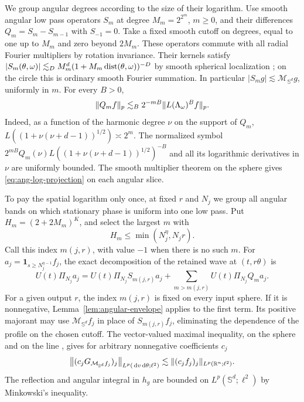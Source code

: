 We group angular degrees according to the size of their logarithm.
Use smooth angular low pass operators $S_m$ at degree $M_m=2^{2^m}$,
$m\ge0$, and their differences $Q_m=S_m-S_{m-1}$ with $S_{-1}=0$.
Take a fixed smooth cutoff on degrees, equal to one up to $M_m$ and
zero beyond $2M_m$. These operators commute with all radial Fourier
multipliers by rotation invariance. Their kernels satisfy
$|S_m(\theta,\omega)|\lesssim_D M_m^d
(1+M_m\operatorname{dist}(\theta,\omega))^{-D}$ by smooth spherical localization
\cite[Theorem~3.5 and Corollaries~3.6, 5.3]{NPW2006}; on the circle this is
ordinary smooth Fourier summation. In particular
$|S_m g|\lesssim\mathcal M_{\mathbb S^d}g$, uniformly in $m$.
For every $B>0$,
\begin{equation}\label{eq:ang-log-projection}
 \|Q_m f\|_p\lesssim_B 2^{-mB}\|L(\Lambda_\omega)^B f\|_p .
\end{equation}
Indeed, as a function of the harmonic degree $\nu$ on the support of
$Q_m$, $L((1+\nu(\nu+d-1))^{1/2})\asymp2^m$. The normalized symbol
$2^{mB}Q_m(\nu)L((1+\nu(\nu+d-1))^{1/2})^{-B}$ and all its logarithmic
derivatives in $\nu$ are uniformly bounded. The smooth multiplier theorem
on the sphere \cite[Theorem~4.9(1)]{BonamiClerc1973} gives \eqref{eq:ang-log-projection}
on each angular slice.

To pay the spatial logarithm only once, at fixed $r$ and $N_j$ we group
all angular bands on which stationary phase is uniform into one low pass.
Put
$H_m=(2+2M_m)^K$, and select the largest $m$ with
\begin{equation}\label{eq:ang-eligibility}
 H_m\le \min(N_j^\eta,N_jr).
\end{equation}
Call this index $m(j,r)$, with value $-1$ when there is no such $m$.
For $a_j=\mathbf1_{s\ge N_j^{\eta-1}}f_j$, the exact decomposition of
the retained wave at $(t,r\theta)$ is
\[
 U(t)\Pi_{N_j}a_j=U(t)\Pi_{N_j}S_{m(j,r)}a_j+
            \sum_{m>m(j,r)}U(t)\Pi_{N_j}Q_ma_j.
\]
For a given output $r$, the index $m(j,r)$ is fixed on every input
sphere. If it is nonnegative, Lemma~\ref{lem:angular-envelope} applies
to the first term. Its positive majorant may use
$\mathcal M_{\mathbb S^d}f_j$ in place of $S_{m(j,r)}f_j$, eliminating
the dependence of the profile on the chosen cutoff. The vector-valued
maximal inequality, on the sphere and on the line \cite[Theorem~1.2]{GLY2009}, gives for arbitrary
nonnegative coefficients $c_j$
\[
 \big\|(c_jG_{\mathcal M_{\mathbb S^d}f_j})_j
                 \big\|_{L^p(\,\mathrm d v\,\mathrm d\theta;\ell^2)}
 \lesssim \|(c_jf_j)_j\|_{L^p(\mathbb R^n;\ell^2)} .
\]
The reflection and angular integral in $h_g$ are bounded on
$L^p(\mathbb S^d;\ell^2)$ by Minkowski's inequality.


